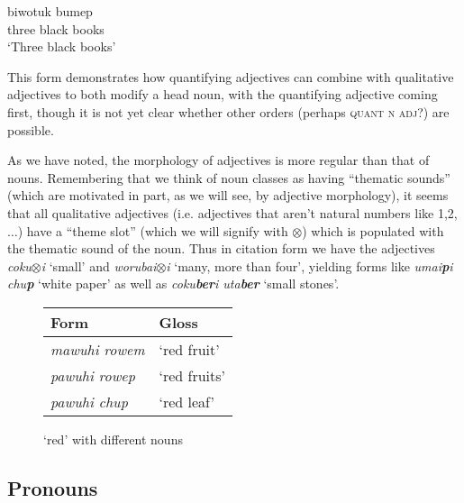 \documentclass[pdftex,12pt,letterpaper]{article}
\let\ipa\textipa
\begin{document}
 \begin{minipage}{\textwidth}
 \begin{exe}
 \ex
 \gll biwotuk \ipa{b@r@h@biwi} bumep \\
 three black books \\
 \trans `Three black books'
 \end{exe}
 \vspace{10px}
 \end{minipage}

 \noindent This form demonstrates how quantifying adjectives can combine with qualitative adjectives to both modify a head noun, with the quantifying adjective coming first, though it is not yet clear whether other orders (perhaps \textsc{quant n adj}?) are possible.

 As we have noted, the morphology of adjectives is more regular than that of nouns. Remembering that we think of noun classes as having ``thematic sounds'' (which are motivated in part, as we will see, by adjective morphology), it seems that all qualitative adjectives (i.e. adjectives that aren't natural numbers like 1,2,$\ldots$) have a ``theme slot'' (which we will signify with $\otimes$) which is populated with the thematic sound of the noun. Thus in citation form we have the adjectives \emph{coku$\otimes$i} `small' and \emph{worubai$\otimes$i} `many, more than four', yielding forms like \emph{umai\textbf{p}i chu\textbf{p}} `white paper' as well as \emph{coku\textbf{ber}i uta\textbf{ber}} `small stones'.

 \begin{figure}[t]
 \begin{center}
 \def\arraystretch{1.4}
 \begin{tabular}{| l | l |}\hline
 Form & Gloss \\\hline
 \emph{mawuhi rowem} & `red fruit' \\\hline
 \emph{pawuhi rowep} & `red fruits' \\\hline
 \emph{pawuhi chup} & `red leaf' \\\hline

 \end{tabular}
 \end{center}
 \caption{`red' with different nouns}
 \end{figure}

 \subsection{Pronouns}
\end{document}
